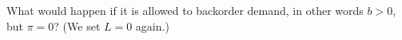 \begin{exercise}
  What would happen if it is allowed to backorder demand, in other
  words $b>0$, but $\pi = 0$? (We set $L=0$ again.)

\end{exercise}

